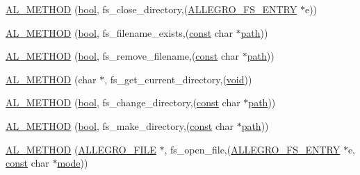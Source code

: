 \begin{DoxyCompactItemize}
\item 
\hyperlink{struct_a_l_l_e_g_r_o___f_s___i_n_t_e_r_f_a_c_e_add74f42d633960e84e7413e8871d66f2}{A\+L\+\_\+\+M\+E\+T\+H\+OD} (\hyperlink{astdbool_8h_abb452686968e48b67397da5f97445f5b}{bool}, fs\+\_\+close\+\_\+directory,(\hyperlink{struct_a_l_l_e_g_r_o___f_s___e_n_t_r_y}{A\+L\+L\+E\+G\+R\+O\+\_\+\+F\+S\+\_\+\+E\+N\+T\+RY} $\ast$e))
\item 
\hyperlink{struct_a_l_l_e_g_r_o___f_s___i_n_t_e_r_f_a_c_e_a238a83650c1e5db99815f67fff1268c8}{A\+L\+\_\+\+M\+E\+T\+H\+OD} (\hyperlink{astdbool_8h_abb452686968e48b67397da5f97445f5b}{bool}, fs\+\_\+filename\+\_\+exists,(\hyperlink{zconf_8h_a2c212835823e3c54a8ab6d95c652660e}{const} char $\ast$\hyperlink{group___library_merger_ga79bd92474fc256263841144176127d9b}{path}))
\item 
\hyperlink{struct_a_l_l_e_g_r_o___f_s___i_n_t_e_r_f_a_c_e_a4ece5fba8506ea11ffaaa3cb486f08ac}{A\+L\+\_\+\+M\+E\+T\+H\+OD} (\hyperlink{astdbool_8h_abb452686968e48b67397da5f97445f5b}{bool}, fs\+\_\+remove\+\_\+filename,(\hyperlink{zconf_8h_a2c212835823e3c54a8ab6d95c652660e}{const} char $\ast$\hyperlink{group___library_merger_ga79bd92474fc256263841144176127d9b}{path}))
\item 
\hyperlink{struct_a_l_l_e_g_r_o___f_s___i_n_t_e_r_f_a_c_e_afa2f2cfd2475997b32dbc957ead757df}{A\+L\+\_\+\+M\+E\+T\+H\+OD} (char $\ast$, fs\+\_\+get\+\_\+current\+\_\+directory,(\hyperlink{png_8h_ac9c84fa68bbad002983e35ce3663c686}{void}))
\item 
\hyperlink{struct_a_l_l_e_g_r_o___f_s___i_n_t_e_r_f_a_c_e_a07766b9ac0e507e706198384108b9bb6}{A\+L\+\_\+\+M\+E\+T\+H\+OD} (\hyperlink{astdbool_8h_abb452686968e48b67397da5f97445f5b}{bool}, fs\+\_\+change\+\_\+directory,(\hyperlink{zconf_8h_a2c212835823e3c54a8ab6d95c652660e}{const} char $\ast$\hyperlink{group___library_merger_ga79bd92474fc256263841144176127d9b}{path}))
\item 
\hyperlink{struct_a_l_l_e_g_r_o___f_s___i_n_t_e_r_f_a_c_e_aac0308a49ae7b12b3543ee163a735f08}{A\+L\+\_\+\+M\+E\+T\+H\+OD} (\hyperlink{astdbool_8h_abb452686968e48b67397da5f97445f5b}{bool}, fs\+\_\+make\+\_\+directory,(\hyperlink{zconf_8h_a2c212835823e3c54a8ab6d95c652660e}{const} char $\ast$\hyperlink{group___library_merger_ga79bd92474fc256263841144176127d9b}{path}))
\item 
\hyperlink{struct_a_l_l_e_g_r_o___f_s___i_n_t_e_r_f_a_c_e_a28426999be150c416c671b7ab3abdd62}{A\+L\+\_\+\+M\+E\+T\+H\+OD} (\hyperlink{file_8h_a9c6d4681b238d8c79191fd6fcc4bd6f8}{A\+L\+L\+E\+G\+R\+O\+\_\+\+F\+I\+LE} $\ast$, fs\+\_\+open\+\_\+file,(\hyperlink{struct_a_l_l_e_g_r_o___f_s___e_n_t_r_y}{A\+L\+L\+E\+G\+R\+O\+\_\+\+F\+S\+\_\+\+E\+N\+T\+RY} $\ast$e, \hyperlink{zconf_8h_a2c212835823e3c54a8ab6d95c652660e}{const} char $\ast$\hyperlink{png_8h_a3eabae3e1e65723a7ec3445646cb7795}{mode}))
\end{DoxyCompactItemize}


